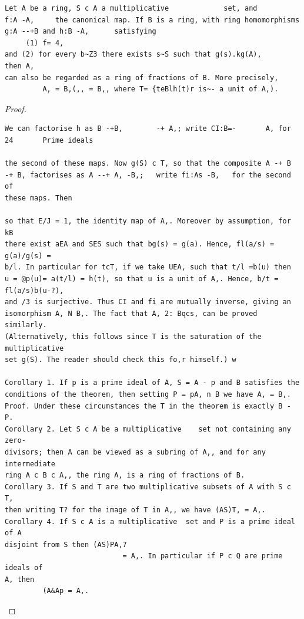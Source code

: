 \begin{theorem}\label{mcrt-auto-theorem-4-3}\uses{}
\begin{verbatim}
Let A be a ring, S c A a multiplicative             set, and
f:A -A,     the canonical map. If B is a ring, with ring homomorphisms
g:A --+B and h:B -A,      satisfying
     (1) f= 4,
and (2) for every b~Z3 there exists s~S such that g(s).kg(A),      then A,
can also be regarded as a ring of fractions of B. More precisely,
         A, = B,(,, = B,, where T= {teBlh(t)r is~- a unit of A,).
\end{verbatim}
\end{theorem}
\begin{proof}
\begin{verbatim}
We can factorise h as B -+B,        -+ A,; write CI:B=-       A, for
24       Prime ideals

the second of these maps. Now g(S) c T, so that the composite A -+ B
-+ B, factorises as A --+ A, -B,;   write fi:As -B,   for the second of
these maps. Then

so that E/J = 1, the identity map of A,. Moreover by assumption, for kB
there exist aEA and SES such that bg(s) = g(a). Hence, fl(a/s) = g(a)/g(s) =
b/l. In particular for tcT, if we take UEA, such that t/l =b(u) then
u = @p(u)= a(t/l) = h(t), so that u is a unit of A,. Hence, b/t = fl(a/s)b(u-?),
and /3 is surjective. Thus CI and fi are mutually inverse, giving an
isomorphism A, N B,. The fact that A, 2: Bqcs, can be proved similarly.
(Alternatively, this follows since T is the saturation of the multiplicative
set g(S). The reader should check this fo,r himself.) w

Corollary 1. If p is a prime ideal of A, S = A - p and B satisfies the
conditions of the theorem, then setting P = pA, n B we have A, = B,.
Proof. Under these circumstances the T in the theorem is exactly B - P.
Corollary 2. Let S c A be a multiplicative    set not containing any zero-
divisors; then A can be viewed as a subring of A,, and for any intermediate
ring A c B c A,, the ring A, is a ring of fractions of B.
Corollary 3. If S and T are two multiplicative subsets of A with S c T,
then writing T? for the image of T in A,, we have (AS)T, = A,.
Corollary 4. If S c A is a multiplicative  set and P is a prime ideal of A
disjoint from S then (AS)PA,7
                            = A,. In particular if P c Q are prime ideals of
A, then
         (A&Ap = A,.
\end{verbatim}
\end{proof}


